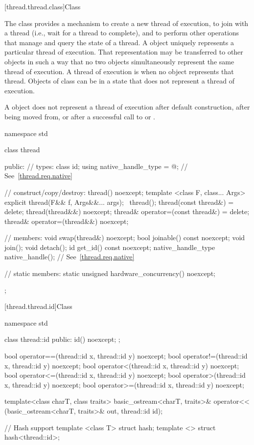 [thread.thread.class]{Class }

\pnum
The class  provides a mechanism to create a new thread of execution, to join with
a thread (i.e., wait for a thread to complete), and to perform other operations that manage and
query the state of a thread. A  object uniquely represents a particular thread of
execution. That representation may be transferred to other  objects in such a way
that no two  objects simultaneously represent the same thread of execution. A
thread of execution is  when no  object represents that thread.
Objects of class  can be in a state that does not represent a thread of
execution. \begin{note} A  object does not represent a thread of execution after
default construction, after being moved from, or after a successful call to  or
. \end{note}

%
\begin{codeblock}
namespace std {
  class thread {
  public:
    // types:
    class id;
    using native_handle_type = @\impdef@; // See~\ref{thread.req.native}

    // construct/copy/destroy:
    thread() noexcept;
    template <class F, class... Args> explicit thread(F&& f, Args&&... args);
    ~thread();
    thread(const thread&) = delete;
    thread(thread&&) noexcept;
    thread& operator=(const thread&) = delete;
    thread& operator=(thread&&) noexcept;

    // members:
    void swap(thread&) noexcept;
    bool joinable() const noexcept;
    void join();
    void detach();
    id get_id() const noexcept;
    native_handle_type native_handle(); // See~\ref{thread.req.native}

    // static members:
    static unsigned hardware_concurrency() noexcept;
  };
}
\end{codeblock}

[thread.thread.id]{Class }

%
%
\begin{codeblock}
namespace std {
  class thread::id {
  public:
      id() noexcept;
  };

  bool operator==(thread::id x, thread::id y) noexcept;
  bool operator!=(thread::id x, thread::id y) noexcept;
  bool operator<(thread::id x, thread::id y) noexcept;
  bool operator<=(thread::id x, thread::id y) noexcept;
  bool operator>(thread::id x, thread::id y) noexcept;
  bool operator>=(thread::id x, thread::id y) noexcept;

  template<class charT, class traits>
    basic_ostream<charT, traits>&
      operator<< (basic_ostream<charT, traits>& out, thread::id id);

  // Hash support
  template <class T> struct hash;
  template <> struct hash<thread::id>;
}
\end{codeblock}

